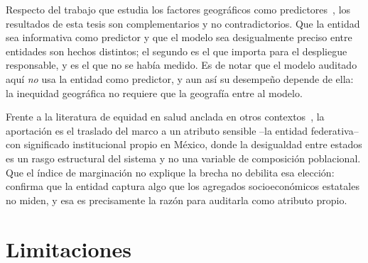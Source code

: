 Respecto del trabajo que estudia los factores geográficos como
predictores~\parencite{geograficos2024}, los resultados de esta tesis son
complementarios y no contradictorios. Que la entidad sea informativa como
predictor y que el modelo sea desigualmente preciso entre entidades son hechos
distintos; el segundo es el que importa para el despliegue responsable, y es el
que no se había medido. Es de notar que el modelo auditado aquí \emph{no} usa la
entidad como predictor, y aun así su desempeño depende de ella: la inequidad
geográfica no requiere que la geografía entre al modelo.

Frente a la literatura de equidad en salud anclada en otros
contextos~\parencite{nejadshamsi2026,riccilara2022}, la aportación es el traslado del
marco a un atributo sensible --la entidad federativa-- con significado
institucional propio en México, donde la desigualdad entre estados es un rasgo
estructural del sistema y no una variable de composición poblacional. Que el
índice de marginación no explique la brecha no debilita esa elección: confirma
que la entidad captura algo que los agregados socioeconómicos estatales no
miden, y esa es precisamente la razón para auditarla como atributo propio.

\section{Limitaciones}
\label{sec:limitaciones}

